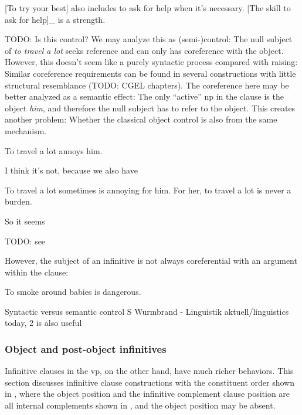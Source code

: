 \documentclass[UTF8, a4paper, oneside, scheme=plain]{ctexrep}
\newcommand*{\citepage}[1]{p.~{#1}}
\newcommand{\corpus}[1]{\emph{#1}}
\begin{document}
\begin{exe}
    \ex\label{ex:complement.infinitive.1} 
    [To try your best] also includes to ask for help when it's necessary.
    \ex\label{ex:complement.infinitive.1p} [The skill to ask for help]_{}
    is a strength.
\end{exe}

TODO: Is this control?
We may analyze this as (semi-)control:
The null subject of \corpus{to travel a lot} 
seeks reference and can only has coreference with the object.
However, this doesn't seem like a purely syntactic process
compared with raising:
Similar coreference requirements can be found in 
several constructions with little structural resemblance
(TODO: CGEL chapters).
The coreference here may be better analyzed as a semantic effect:
The only ``active'' \acs{np} in the clause is the object \corpus{him},
and therefore the null subject has to refer to the object.
This creates another problem: 
Whether the classical object control is also from the same mechanism.

\begin{exe}
    \ex To travel a lot annoys him.
\end{exe}
I think it's not, because we also have 
\begin{exe}
    \ex To travel a lot sometimes is annoying for him.
    \ex For her, to travel a lot is never a burden.
\end{exe}
So it seems 

TODO: see \citet[\citepage{1269}]{cgel}

However, the subject of an infinitive is not always coreferential with an argument within the clause:
\begin{exe}
    \ex To smoke around babies is dangerous.
\end{exe} 

Syntactic versus semantic control
S Wurmbrand - Linguistik aktuell/linguistics today, 2 is also useful

\subsubsection{Object and post-object infinitives}

Infinitive clauses in the \acs{vp},
on the other hand, 
have much richer behaviors.
This section discusses infinitive clause constructions with the constituent order 
shown in ,
where the object position and the infinitive complement clause position 
are all internal complements shown in ,
and the object position may be absent.
\end{document}
